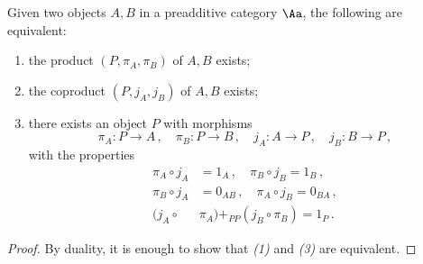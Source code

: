 \begin{prop}\label{biproduct}
    Given two objects $A,B$ in a preadditive category $\Aa$,
    the following are equivalent:
    \begin{enumerate}
        \item the product $(P,\pi_{A}, \pi_{B})$ of $A,B$ exists;
        \item the coproduct $(P,j_{A},j_{B})$ of $A,B$ exists;
        \item there exists an object $P$ with morphisms
        \begin{equation*}
            \pi_{A} : P \to A\,, \quad \pi_{B} : P \to B\,,
            \quad j_{A} : A \to P\,, \quad j_{B} : B \to P\,,
        \end{equation*}
        with the properties
        \begin{align*}
            \pi_{A} \circ j_{A} &= 1_{A}\,, \quad
            \pi_{B} \circ j_{B} = 1_{B}\,, \\
            \pi_{B} \circ j_{A} &= 0_{AB}\,, \quad
            \pi_{A} \circ j_{B} = 0_{BA}\,, \\
            (j_{A} \circ &\pi_{A}) +_{PP} (j_{B} \circ \pi_{B})
            = 1_{P}\,.
        \end{align*}
    \end{enumerate}
    \begin{proof}
        By duality, it is enough to show that \emph{(1)} and \emph{(3)}
        are equivalent.
        

\end{proof}
\end{prop}
